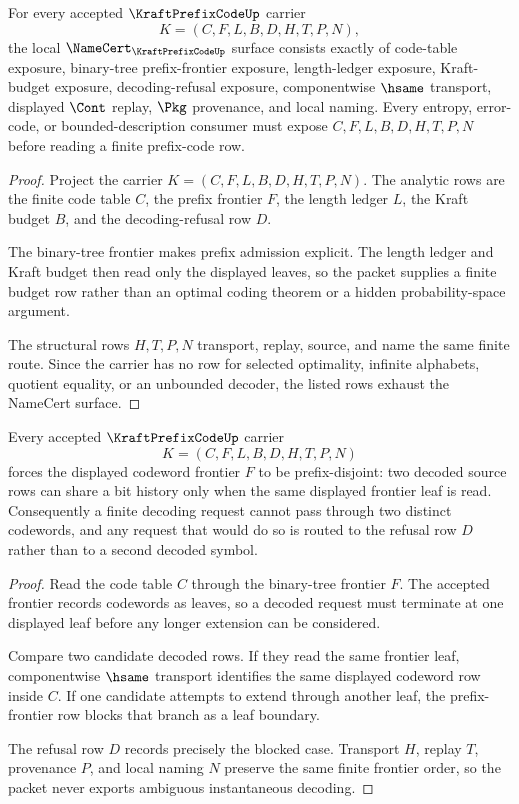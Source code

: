 \begin{theorem}
\label{thm:kraft-prefix-code-namecert-obligations}
For every accepted $\KraftPrefixCodeUp$ carrier
$$
K=(C,F,L,B,D,H,T,P,N),
$$
the local $\NameCert_{\KraftPrefixCodeUp}$ surface consists exactly of code-table exposure, binary-tree prefix-frontier exposure, length-ledger exposure, Kraft-budget exposure, decoding-refusal exposure, componentwise $\hsame$ transport, displayed $\Cont$ replay, $\Pkg$ provenance, and local naming. Every entropy, error-code, or bounded-description consumer must expose $C,F,L,B,D,H,T,P,N$ before reading a finite prefix-code row.
\end{theorem}
\begin{proof}
Project the carrier $K=(C,F,L,B,D,H,T,P,N)$. The analytic rows are the finite code table $C$, the prefix frontier $F$, the length ledger $L$, the Kraft budget $B$, and the decoding-refusal row $D$.

The binary-tree frontier makes prefix admission explicit. The length ledger and Kraft budget then read only the displayed leaves, so the packet supplies a finite budget row rather than an optimal coding theorem or a hidden probability-space argument.

The structural rows $H,T,P,N$ transport, replay, source, and name the same finite route. Since the carrier has no row for selected optimality, infinite alphabets, quotient equality, or an unbounded decoder, the listed rows exhaust the NameCert surface.
\end{proof}

\begin{theorem}
\label{thm:kraft-prefix-code-prefix-disjointness}
Every accepted $\KraftPrefixCodeUp$ carrier
$$
K=(C,F,L,B,D,H,T,P,N)
$$
forces the displayed codeword frontier $F$ to be prefix-disjoint: two decoded source rows can share a bit history only when the same displayed frontier leaf is read. Consequently a finite decoding request cannot pass through two distinct codewords, and any request that would do so is routed to the refusal row $D$ rather than to a second decoded symbol.
\end{theorem}
\begin{proof}
Read the code table $C$ through the binary-tree frontier $F$. The accepted frontier records codewords as leaves, so a decoded request must terminate at one displayed leaf before any longer extension can be considered.

Compare two candidate decoded rows. If they read the same frontier leaf, componentwise $\hsame$ transport identifies the same displayed codeword row inside $C$. If one candidate attempts to extend through another leaf, the prefix-frontier row blocks that branch as a leaf boundary.

The refusal row $D$ records precisely the blocked case. Transport $H$, replay $T$, provenance $P$, and local naming $N$ preserve the same finite frontier order, so the packet never exports ambiguous instantaneous decoding.
\end{proof}

